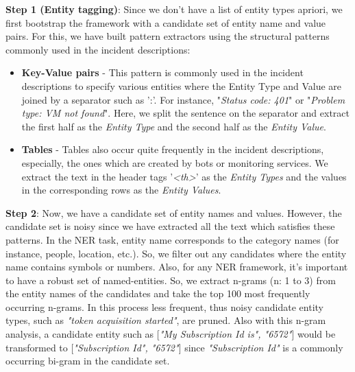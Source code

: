 \textbf{Step 1 (Entity tagging)}: Since we don't have a list of entity types apriori, we first bootstrap the framework with a candidate set of entity name and value pairs. For this, we have built pattern extractors using the structural patterns commonly used in the incident descriptions: 
\begin{itemize}
    \item \textbf{Key-Value pairs} - This pattern is commonly used in the incident descriptions to specify various entities where the Entity Type and Value are joined by a separator such as ':'. For instance, "\textit{Status code: 401}" or "\textit{Problem type: VM not found}". Here, we split the sentence on the separator and extract the first half as the \textit{Entity Type} and the second half as the \textit{Entity Value}.
    \item \textbf{Tables} - Tables also occur quite frequently in the incident descriptions, especially, the ones which are created by bots or monitoring services. We extract the text in the header tags '\textit{<th>}' as the \textit{Entity Types} and the values in the corresponding rows as the \textit{Entity Values}.
\end{itemize}
 
\textbf{Step 2}: Now, we have a candidate set of entity names and values. However, the candidate set is noisy since we have extracted all the text which satisfies these patterns. In the NER task, entity name corresponds to the category names (for instance, people, location, etc.). So, we filter out any candidates where the entity name contains symbols or numbers. Also, for any NER framework, it's important to have a robust set of named-entities. So, we extract n-grams (n: 1 to 3) from the entity names of the candidates and take the top 100 most frequently occurring n-grams. In this process less frequent, thus noisy candidate entity types, such as \textit{"token acquisition started"}, are pruned. Also with this n-gram analysis, a candidate entity such as [\textit{"My Subscription Id is", "6572"}] would be transformed to [\textit{"Subscription Id", "6572"}] since \textit{"Subscription Id"} is a commonly occurring bi-gram in the candidate set. 

